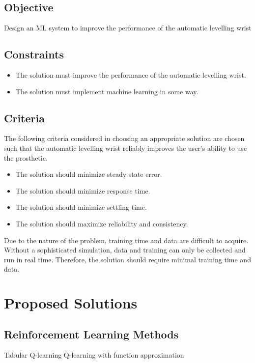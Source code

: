 \documentclass[letterpaper,12pt]{article}
\begin{document}
\subsection{Objective}
Design an ML system to improve the performance of the automatic levelling wrist

\subsection{Constraints}

\begin{itemize}
		\item The solution must improve the performance of the automatic levelling wrist.
    \item The solution must implement machine learning in some way.

\end{itemize}

\subsection{Criteria}
The following criteria considered in choosing an appropriate solution are chosen such that the automatic levelling wrist reliably improves the user's ability to use the prosthetic.
\begin{itemize}
    \item The solution should minimize steady state error.
		\item The solution should minimize response time.
		\item The solution should minimize settling time.
		\item The solution should maximize reliability and consistency.
\end{itemize}
Due to the nature of the problem, training time and data are difficult to acquire. Without a sophisticated simulation, data and training can only be collected and run in real time. Therefore, the solution should require minimal training time and data.

\section{Proposed Solutions}
\subsection{Reinforcement Learning Methods}
Tabular Q-learning
Q-learning with function approximation
\end{document}
